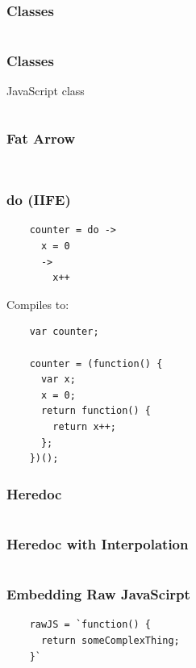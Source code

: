 \documentclass{beamer}
\begin{document}
\begin{frame}
  \frametitle{Classes}
    \inputminted[lineos=false,fontsize=\normalsize]{coffeescript}{src/sku-class.coffee}
\end{frame}

\begin{frame}
  \frametitle{Classes}
  JavaScript class
  \vspace{.5cm}
  \inputminted[lineos=true,fontsize=\tiny]{javascript}{src/sku-class.js}
\end{frame}

\begin{frame}
  \frametitle{Fat Arrow}
  \inputminted[lineos=false,fontsize=\normalsize]{coffeescript}{src/fat.coffee}
  \pause
  \vspace{.5cm}
  \inputminted[lineos=false,fontsize=\small]{javascript}{src/fat.js}
\end{frame}

\begin{frame}[fragile]
  \frametitle{do (IIFE)}
  \begin{verbatim}
    counter = do ->
      x = 0
      ->
        x++
  \end{verbatim}
  \pause
  \vspace{.5cm}
  Compiles to:
  \vspace{.5cm}
  \begin{verbatim}
    var counter;

    counter = (function() {
      var x;
      x = 0;
      return function() {
        return x++;
      };
    })();
  \end{verbatim}
\end{frame}

\begin{frame}
  \frametitle{Heredoc}
  \inputminted{coffeescript}{src/heredoc.coffee}
\end{frame}

\begin{frame}
  \frametitle{Heredoc with Interpolation}
  \inputminted{coffeescript}{src/heredoc_interp.coffee}
\end{frame}

\begin{frame}[fragile]
  \frametitle{Embedding Raw JavaScirpt}
  \begin{verbatim}
    rawJS = `function() {
      return someComplexThing;
    }`
  \end{verbatim}
\end{frame}
\end{document}
